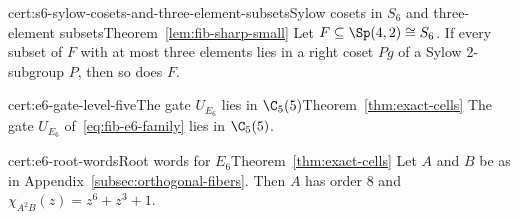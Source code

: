 \begin{finitefact}{cert:s6-sylow-cosets-and-three-element-subsets}{Sylow cosets in $S_6$ and three-element subsets}{Theorem~\ref{lem:fib-sharp-small}}
Let $F\subseteq\Sp(4,2)\cong S_6$. If every subset of $F$ with at most three elements lies in a right coset $Pg$ of a Sylow $2$-subgroup $P$, then so does $F$.
\end{finitefact}

\begin{finitefact}{cert:e6-gate-level-five}{The gate $U_{E_6}$ lies in $\C_5(5)$}{Theorem~\ref{thm:exact-cells}}
The gate $U_{E_6}$ of~\eqref{eq:fib-e6-family} lies in $\C_5(5)$.
\end{finitefact}

\begin{finitefact}{cert:e6-root-words}{Root words for $E_6$}{Theorem~\ref{thm:exact-cells}}
Let $A$ and $B$ be as in Appendix~\ref{subsec:orthogonal-fibers}. Then $A$ has order $8$ and $\chi_{A^2B}(z)=z^6+z^3+1$.
\end{finitefact}
